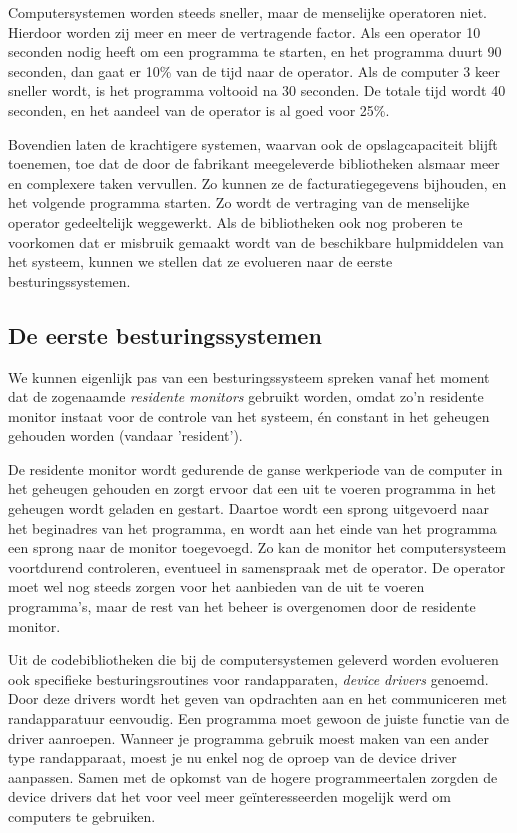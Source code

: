 Computersystemen worden steeds sneller, maar de menselijke
operatoren niet. Hierdoor worden zij meer en meer de vertragende
factor. Als een operator 10 seconden nodig heeft om een programma te
starten, en het programma duurt 90 seconden, dan gaat er 10\% van de
tijd naar de operator. Als de computer 3 keer sneller wordt, is het
programma voltooid na 30 seconden. De totale tijd wordt 40 seconden,
en het aandeel van de operator is al goed voor 25\%.

Bovendien laten de krachtigere systemen, waarvan ook de
opslagcapaciteit blijft toenemen, toe dat de door de fabrikant
meegeleverde bibliotheken alsmaar meer en complexere taken vervullen.
Zo kunnen ze de facturatiegegevens bijhouden, en het volgende
programma starten. Zo wordt de vertraging van de menselijke operator
gedeeltelijk weggewerkt. Als de bibliotheken ook nog proberen te
voorkomen dat er misbruik gemaakt wordt van de beschikbare
hulpmiddelen van het systeem, kunnen we stellen dat ze evolueren naar
de eerste besturingssystemen.

\subsection{De eerste besturingssystemen}

We kunnen eigenlijk pas van een besturingssysteem spreken vanaf
het moment dat de zogenaamde \emph{residente monitors}
gebruikt worden, omdat zo'n residente monitor instaat voor de controle
van het systeem, \'en constant in het geheugen gehouden worden (vandaar
'resident').

De residente monitor wordt gedurende de ganse werkperiode van de
computer in het geheugen gehouden en zorgt ervoor dat een uit te
voeren programma in het geheugen wordt geladen en gestart. Daartoe
wordt een sprong uitgevoerd naar het beginadres van het programma, en
wordt aan het einde van het programma een sprong naar de monitor
toegevoegd. Zo kan de monitor het computersysteem voortdurend
controleren, eventueel in samenspraak met de operator. De operator
moet wel nog steeds zorgen voor het aanbieden van de uit te voeren
programma's, maar de rest van het beheer is overgenomen door de
residente monitor.

Uit de codebibliotheken die bij de computersystemen geleverd
worden evolueren ook specifieke besturingsroutines voor randapparaten,
\emph{device drivers} genoemd. Door deze drivers wordt
het geven van opdrachten aan en het communiceren met randapparatuur
eenvoudig. Een programma moet gewoon de juiste functie van de driver
aanroepen. Wanneer je programma gebruik moest maken van een ander type
randapparaat, moest je nu enkel nog de oproep van de device driver
aanpassen. Samen met de opkomst van de hogere programmeertalen zorgden
de device drivers dat het voor veel meer ge\"interesseerden mogelijk
werd om computers te gebruiken.

